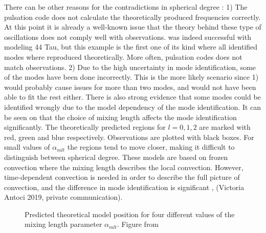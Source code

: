   There can be other reasons for the contradictions in spherical degree : 1) The pulsation code does not calculate the theoretically produced frequencies correctly. At this point it is already a well-known issue that the theory behind these type of oscillations does not comply well with observations. \citet{lenz2010delta} was indeed successful with modeling 44 Tau, but this example is the first one of its kind where all identified modes where reproduced theoretically. More often, pulsation codes does not match observations. 2) Due to the high uncertainty in mode identification, some of the modes have been done incorrectly. This is the more likely scenario since 1) would probably cause issues for more than two modes, and would not have been able to fit the rest either. There is also strong evidence that some modes could be identified wrongly due to the model dependency of the mode identification. It can be seen on  that the choice of mixing length affects the mode identification significantly. The theoretically predicted regions for $l=0,1,2$ are marked with red, green and blue respectively. Observations are plotted with black boxes. For small values of $\alpha_{mlt}$ the regions tend to move closer, making it difficult to distinguish between spherical degree. These models are based on frozen convection where the mixing length describes the local convection. However, time-dependent convection is needed in order to describe the full picture of convection, and the difference in mode identification is significant \citep{dupret2005time}, (Victoria Antoci 2019, private communication).
\begin{figure}[htbp]
	\centering
	\caption{Predicted theoretical model position for four different values of the mixing length parameter $\alpha_{mlt}$.  Figure from \citet{lenz2009diss}  }
	\label{lenzdiss}
\end{figure}
